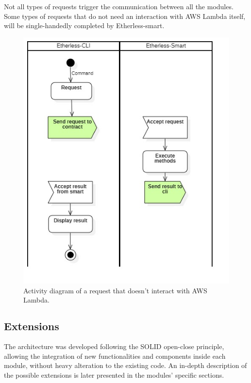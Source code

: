 	Not all types of requests trigger the communication between all the modules. Some types of requests that do not need an interaction with AWS Lambda itself, will be single-handedly completed by Etherless-smart.
	\begin{figure} [h!]
		\centering
		\includegraphics[width=0.8\linewidth]{diagrammi/generali/activity_diag_pattern1}
		\caption{Activity diagram of a request that doesn't interact with AWS Lambda.}
	\end{figure}
	\pagebreak
	\subsection{Extensions} %
	The architecture was developed following the SOLID open-close principle, allowing the integration of new functionalities and components inside each module, without heavy alteration to the existing code. An in-depth description of the possible extensions is later presented in the modules' specific sections.  